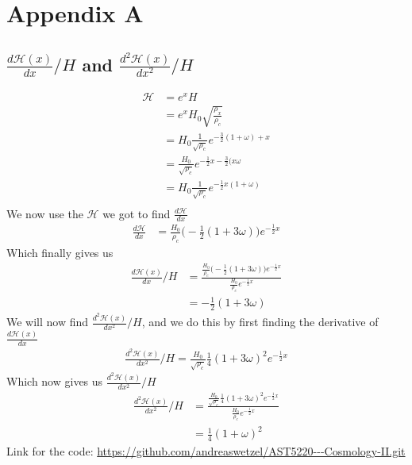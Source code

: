 \documentclass{article}
\begin{document}
\section{Appendix A}
\label{A.1}
\subsection{$\frac{d\mathcal{H}(x)}{dx}/H$ and $\frac{d^2\mathcal{H}(x)}{dx^2}/H$}
\begin{align*}
    {\mathcal{H}}&=e^xH\\
    &=e^xH_0\sqrt{\frac{\rho_x}{\rho_c}}\\
    &=H_0\frac{1}{\sqrt{\rho_c}}e^{-\frac{3}{2}(1+\omega)+x}\\
    &=\frac{H_0}{\sqrt{\rho_c}}e^{-\frac{1}{2}x-\frac{3}{2}(x\omega}\\
    &=H_0\frac{1}{\sqrt{\rho_c}}e^{-\frac{1}{2}x(1+\omega)}\\
\end{align*}
We now use the $\mathcal{H}$ we got to find $\frac{d\mathcal{H}}{dx}$ 
\begin{align*}
    \frac{d\mathcal{H}}{dx}&=\frac{H_0}{\rho_c}\bigg(-\frac{1}{2}(1+3\omega)\bigg)e^{-\frac{1}{2}x}
\end{align*}
Which finally gives us 
\begin{align}
    {\frac{d\mathcal{H}(x)}{dx}/H}&=\frac{\frac{H_0}{\rho_c}\bigg(-\frac{1}{2}(1+3\omega)\bigg)e^{-\frac{1}{2}x}}{\frac{H_0}{\rho_c}e^{-\frac{1}{2}x}}\\
    &=-\frac{1}{2}(1+3\omega)
\end{align}
We will now find $\frac{d^2\mathcal{H}(x)}{dx^2}/H$, and we do this by first finding the derivative of $\frac{d\mathcal{H}(x)}{dx}$
\begin{align}
    \frac{d^2\mathcal{H}(x)}{dx^2}/H=\frac{H_0}{\sqrt{\rho_c}}\frac{1}{4}(1+3\omega)^2e^{-\frac{1}{2}x} 
\end{align}
Which now gives us $\frac{d^2\mathcal{H}(x)}{dx^2}/H$
\begin{align}
    \frac{d^2\mathcal{H}(x)}{dx^2}/H&=\frac{\frac{H_0}{\sqrt{\rho_c}}\frac{1}{4}(1+3\omega)^2e^{-\frac{1}{2}x} }{\frac{H_0}{\rho_c}e^{-\frac{1}{2}x}}\\
    &=\frac{1}{4}(1+\omega)^2
\end{align}
\clearpage
Link for the code: \url{https://github.com/andreaswetzel/AST5220---Cosmology-II.git}\\
\\
\\
\\
\end{document}
